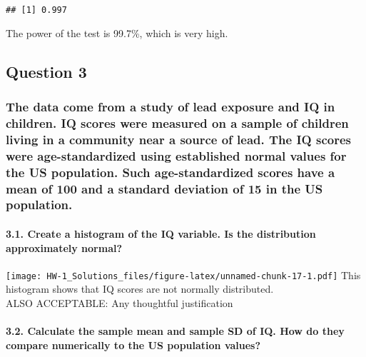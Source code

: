 \documentclass[
]{article}
\begin{document}
\begin{verbatim}
## [1] 0.997
\end{verbatim}

The power of the test is 99.7\%, which is very high.

\hypertarget{question-3}{%
\subsection{Question 3}\label{question-3}}

\hypertarget{the-data-come-from-a-study-of-lead-exposure-and-iq-in-children.-iq-scores-were-measured-on-a-sample-of-children-living-in-a-community-near-a-source-of-lead.-the-iq-scores-were-age-standardized-using-established-normal-values-for-the-us-population.-such-age-standardized-scores-have-a-mean-of-100-and-a-standard-deviation-of-15-in-the-us-population.}{%
\subsubsection{The data come from a study of lead exposure and IQ in
children. IQ scores were measured on a sample of children living in a
community near a source of lead. The IQ scores were age-standardized
using established normal values for the US population. Such
age-standardized scores have a mean of 100 and a standard deviation of
15 in the US
population.}\label{the-data-come-from-a-study-of-lead-exposure-and-iq-in-children.-iq-scores-were-measured-on-a-sample-of-children-living-in-a-community-near-a-source-of-lead.-the-iq-scores-were-age-standardized-using-established-normal-values-for-the-us-population.-such-age-standardized-scores-have-a-mean-of-100-and-a-standard-deviation-of-15-in-the-us-population.}}

\hypertarget{create-a-histogram-of-the-iq-variable.-is-the-distribution-approximately-normal}{%
\paragraph{3.1. Create a histogram of the IQ variable. Is the
distribution approximately
normal?}\label{create-a-histogram-of-the-iq-variable.-is-the-distribution-approximately-normal}}

\texttt{[image: HW-1\_Solutions\_files/figure-latex/unnamed-chunk-17-1.pdf]}
This histogram shows that IQ scores are not normally distributed.\\
ALSO ACCEPTABLE: Any thoughtful justification

\hypertarget{calculate-the-sample-mean-and-sample-sd-of-iq.-how-do-they-compare-numerically-to-the-us-population-values}{%
\paragraph{3.2. Calculate the sample mean and sample SD of IQ. How do
they compare numerically to the US population
values?}\label{calculate-the-sample-mean-and-sample-sd-of-iq.-how-do-they-compare-numerically-to-the-us-population-values}}
\end{document}
